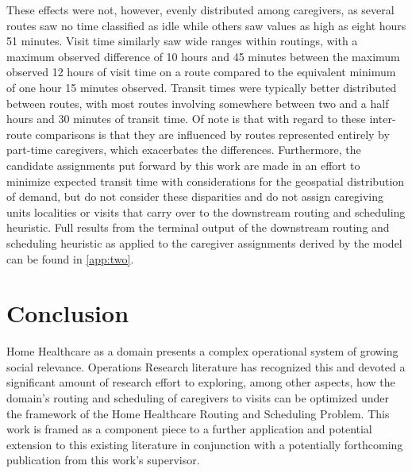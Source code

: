 \documentclass[11pt,twoside]{article}
\numberwithin{Theorem}{section}
\numberwithin{Definition}{section}
\numberwithin{Lemma}{section}
\numberwithin{Algorithm}{section}
\numberwithin{equation}{section}
\begin{document}
These effects were not, however, evenly distributed among caregivers, as several routes saw no time classified as idle while others saw values as high as eight hours 51 minutes. Visit time similarly saw wide ranges within routings, with a maximum observed difference of 10 hours and 45 minutes between the maximum observed 12 hours of visit time on a route compared to the equivalent minimum of one hour 15 minutes observed. Transit times were typically better distributed between routes, with most routes involving somewhere between two and a half hours and 30 minutes of transit time. Of note is that with regard to these inter-route comparisons is that they are influenced by routes represented entirely by part-time caregivers, which exacerbates the differences. Furthermore, the candidate assignments put forward by this work are made in an effort to minimize expected transit time with considerations for the geospatial distribution of demand, but do not consider these disparities and do not assign caregiving units localities or visits that carry over to the downstream routing and scheduling heuristic. Full results from the terminal output of the downstream routing and scheduling heuristic as applied to the caregiver assignments derived by the model can be found in \ref{app:two}.
\clearpage

\section{Conclusion}
\label{sec:conc}
Home Healthcare as a domain presents a complex operational system of growing social relevance. Operations Research literature has recognized this and devoted a significant amount of research effort to exploring, among other aspects, how the domain's routing and scheduling of caregivers to visits can be optimized under the framework of the Home Healthcare Routing and Scheduling Problem. This work is framed as a component piece to a further application and potential extension to this existing literature in conjunction with a potentially forthcoming publication from this work's supervisor. 
\end{document}
